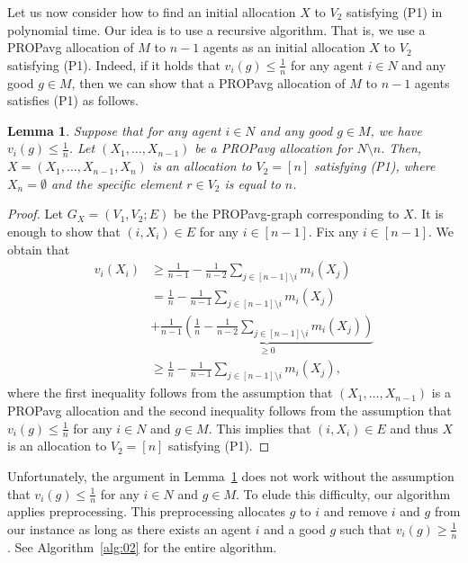 \documentclass[11pt]{article}
\newtheorem{lemma}[theorem]{Lemma}
\newcommand{\PROPavg}{\textsf{PROPavg}\xspace}
\begin{document}
Let us now consider how to find an initial allocation $X$ to $V_2$ satisfying (P1) in polynomial time.
Our idea is to use a recursive algorithm.
That is, we use a \PROPavg allocation of $M$ to $n-1$ agents as an initial allocation $X$ to $V_2$ satisfying (P1).
Indeed, if it holds that $v_i(g)\le \frac{1}{n}$ for any agent $i\in N$ and any good $g\in M$, then we can show that a \PROPavg allocation of $M$ to $n-1$ agents satisfies (P1) as follows.

\begin{lemma}\label{lem: rec}
Suppose that for any agent $i\in N$ and any good $g\in M$, we have $v_i(g)\le \frac{1}{n}$.
Let $(X_1,\ldots ,X_{n-1})$ be a \PROPavg allocation for $N\setminus n$.
Then, $X=(X_1,\ldots ,X_{n-1}, X_n )$ is an allocation to $V_2=[n]$ satisfying (P1), where $X_n = \emptyset$ and the specific element $r\in V_2$ is equal to $n$.
\end{lemma}
\begin{proof}
Let $G_X=(V_1, V_2; E)$ be the \PROPavg-graph corresponding to $X$.
It is enough to show that $(i, X_i)\in E$ for any $i\in [n-1]$.
Fix any $i\in [n-1]$.
We obtain that 
\begin{align*}
v_i(X_i) &\ge \frac{1}{n-1}-\frac{1}{n-2}\sum_{j\in [n-1]\setminus i} m_i(X_j)\\
&=\frac{1}{n}-\frac{1}{n-1}\sum_{j\in [n-1]\setminus i} m_i(X_j)\\
&+\underbrace{ \frac{1}{n-1}\left(\frac{1}{n} -\frac{1}{n-2}\sum_{j\in [n-1]\setminus i} m_i(X_j)\right)}_{\ge 0}\\
&\ge \frac{1}{n}-\frac{1}{n-1}\sum_{j\in [n-1]\setminus i} m_i(X_j), 
\end{align*}
where the first inequality follows from the assumption that $(X_1,\ldots ,X_{n-1})$ is a \PROPavg allocation and the second inequality follows from the assumption that $v_i(g) \le \frac{1}{n}$ for any $i\in N$ and $g\in M$.
This implies that $(i, X_i)\in E$ and thus $X$ is an allocation to $V_2=[n]$ satisfying (P1).
\end{proof}

Unfortunately, the argument in Lemma~\ref{lem: rec} does not work without the assumption that $v_i(g)\le \frac{1}{n}$ for any $i\in N$ and $g\in M$.
To elude this difficulty, our algorithm applies preprocessing.
This preprocessing allocates $g$ to $i$ and remove $i$ and $g$ from our instance as long as there exists an agent $i$ and a good $g$ such that $v_i(g)\ge \frac{1}{n}$.
See Algorithm~\ref{alg:02} for the entire algorithm.
\end{document}
